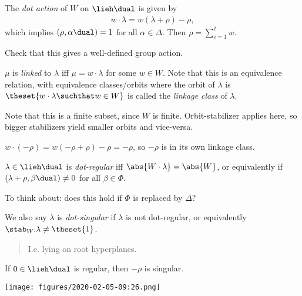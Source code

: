 \begin{description}
\tightlist
\item[Definition (Dot Action)]
The \emph{dot action} of \(W\) on \(\lieh\dual\) is given by
\begin{align*}w\cdot \lambda = w(\lambda + \rho) - \rho,\end{align*}
which implies \((\rho, \alpha\dual) = 1\) for all \(\alpha \in \Delta\).
Then \(\rho = \sum_{i=1}^\ell w\).
\item[Exercise]
Check that this gives a well-defined group action.
\item[Definition (Linkage Class)]
\(\mu\) is \emph{linked} to \(\lambda\) iff \(\mu = w\cdot \lambda\) for
some \(w\in W\). Note that this is an equivalence relation, with
equivalence classes/orbits where the orbit of \(\lambda\) is
\(\theset{w\cdot \lambda \suchthat w\in W}\) is called the \emph{linkage
class} of \(\lambda\).
\end{description}

Note that this is a finite subset, since \(W\) is finite.
Orbit-stabilizer applies here, so bigger stabilizers yield smaller
orbits and vice-versa.

\begin{description}
\tightlist
\item[Example]
\(w\cdot (-\rho) = w(-\rho + \rho) - \rho = -\rho\), so \(-\rho\) is in
its own linkage class.
\item[Definition (Dot-Regular)]
\(\lambda \in \lieh\dual\) is \emph{dot-regular} iff
\(\abs{W\cdot \lambda } = \abs{W}\), or equivalently if
\((\lambda + \rho, \beta\dual) \neq 0\) for all \(\beta \in \Phi\).
\end{description}

To think about: does this hold if \(\Phi\) is replaced by \(\Delta\)?

We also say \(\lambda\) is \emph{dot-singular} if \(\lambda\) is not
dot-regular, or equivalently \(\stab_{W\cdot}\lambda \neq \theset{1}\).

\begin{quote}
I.e. lying on root hyperplanes.
\end{quote}

\begin{description}
\tightlist
\item[Exercise]
If \(0\in \lieh\dual\) is regular, then \(-\rho\) is singular.
\end{description}

\texttt{[image: figures/2020-02-05-09:26.png]}\\

